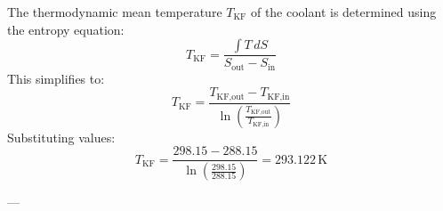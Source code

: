 The thermodynamic mean temperature \( T_{\text{KF}} \) of the coolant is determined using the entropy equation:  
\[
T_{\text{KF}} = \frac{\int T \, dS}{S_{\text{out}} - S_{\text{in}}}
\]  
This simplifies to:  
\[
T_{\text{KF}} = \frac{T_{\text{KF,out}} - T_{\text{KF,in}}}{\ln\left(\frac{T_{\text{KF,out}}}{T_{\text{KF,in}}}\right)}
\]  
Substituting values:  
\[
T_{\text{KF}} = \frac{298.15 - 288.15}{\ln\left(\frac{298.15}{288.15}\right)} = 293.122 \, \text{K}
\]  

---